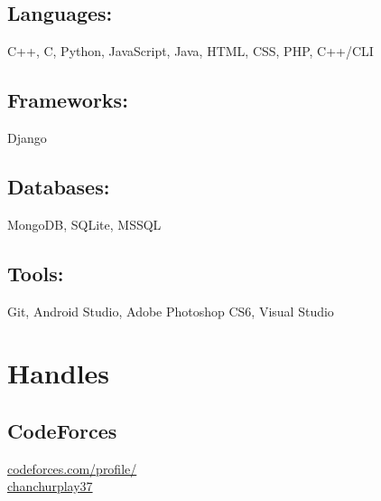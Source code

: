 \documentclass[]{hieudo-build}
\begin{document}
\begin{minipage}[t]{0.3\textwidth}
\subsection[Languages]{Languages:}
C++, C, Python, JavaScript, Java, HTML, CSS, PHP, C++/CLI\\ 

\subsection[Frameworks]{Frameworks:}
Django \\

\subsection[Databases]{Databases:}
MongoDB, SQLite, MSSQL \\

\subsection[Tools]{Tools:}
Git, Android Studio, Adobe Photoshop CS6, Visual Studio \\ 

\sectionsep



\section{Handles}
\subsection{CodeForces}
	\href{http://codeforces.com/profile/chanchurplay37}{codeforces.com/profile/\\chanchurplay37}\\

\end{minipage}
\end{document}
